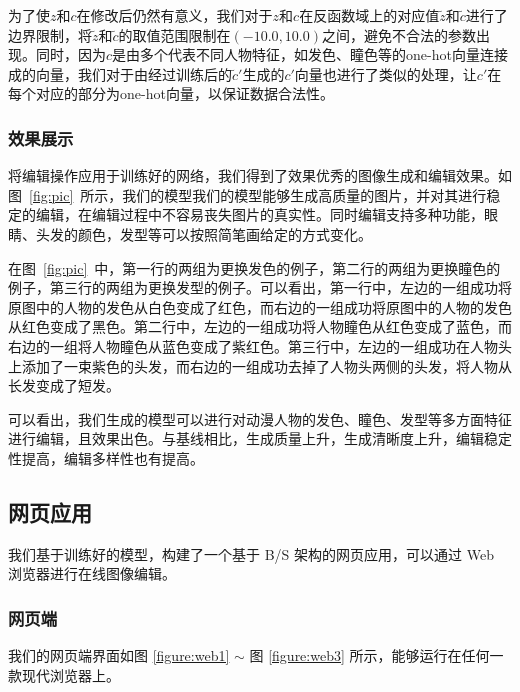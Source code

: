 \documentclass[a4paper,12pt,UTF8]{ctexart}
\begin{document}
为了使$z$和$c$在修改后仍然有意义，我们对于$z$和$c$在反函数域上的对应值$\tilde z$和$\tilde c$进行了边界限制，将$\tilde z$和$\tilde c$的取值范围限制在$(-10.0, 10.0)$之间，避免不合法的参数出现。同时，因为$c$是由多个代表不同人物特征，如发色、瞳色等的one-hot向量连接成的向量，我们对于由经过训练后的$\tilde c'$生成的$c'$向量也进行了类似的处理，让$c'$在每个对应的部分为one-hot向量，以保证数据合法性。

\subsubsection{效果展示}

将编辑操作应用于训练好的网络，我们得到了效果优秀的图像生成和编辑效果。如图~\ref{fig:pic}~所示，我们的模型我们的模型能够生成高质量的图片，并对其进行稳定的编辑，在编辑过程中不容易丧失图片的真实性。同时编辑支持多种功能，眼睛、头发的颜色，发型等可以按照简笔画给定的方式变化。

在图~\ref{fig:pic}~中，第一行的两组为更换发色的例子，第二行的两组为更换瞳色的例子，第三行的两组为更换发型的例子。可以看出，第一行中，左边的一组成功将原图中的人物的发色从白色变成了红色，而右边的一组成功将原图中的人物的发色从红色变成了黑色。第二行中，左边的一组成功将人物瞳色从红色变成了蓝色，而右边的一组将人物瞳色从蓝色变成了紫红色。第三行中，左边的一组成功在人物头上添加了一束紫色的头发，而右边的一组成功去掉了人物头两侧的头发，将人物从长发变成了短发。

可以看出，我们生成的模型可以进行对动漫人物的发色、瞳色、发型等多方面特征进行编辑，且效果出色。与基线相比，生成质量上升，生成清晰度上升，编辑稳定性提高，编辑多样性也有提高。

\subsection{网页应用}

我们基于训练好的模型，构建了一个基于 B/S 架构的网页应用，可以通过 Web 浏览器进行在线图像编辑。

\subsubsection{网页端}
我们的网页端界面如图 \ref{figure:web1} $\sim$ 图 \ref{figure:web3}  所示，能够运行在任何一款现代浏览器上。
\end{document}
